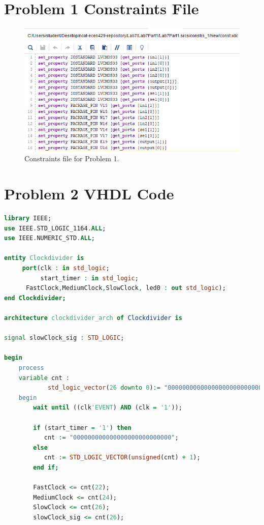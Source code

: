 \documentclass[11pt]{article}
\begin{document}
\begin{appendices}
\section{Problem 1 Constraints File}
\begin{center}
\begin{figure}[H]
	\includegraphics[scale=1]{./images/Lab7Part1Const.png}
	\caption{\label{fig:Prob1Const}Constraints file for Problem 1.}
\end{figure}
\end{center}

\section{Problem 2 VHDL Code}
\begin{lstlisting}[language=VHDL]
library IEEE;
use IEEE.STD_LOGIC_1164.ALL;
use IEEE.NUMERIC_STD.ALL;

entity Clockdivider is
     port(clk : in std_logic;
          start_timer : in std_logic;
	  FastClock,MediumClock,SlowClock, led0 : out std_logic);
end Clockdivider;

architecture clockdivider_arch of Clockdivider is

signal slowClock_sig : STD_LOGIC;

begin
    process  
    variable cnt :	
    		std_logic_vector(26 downto 0):= "000000000000000000000000000";
    begin					 
        wait until ((clk'EVENT) AND (clk = '1'));
	       
		if (start_timer = '1') then
	       cnt := "000000000000000000000000000";
	    else  
           cnt := STD_LOGIC_VECTOR(unsigned(cnt) + 1);
	    end if;

   	    FastClock <= cnt(22);
   	    MediumClock <= cnt(24);	
   	    SlowClock <= cnt(26);
        slowClock_sig <= cnt(26);
	

\end{lstlisting}
\end{appendices}
\end{document}

